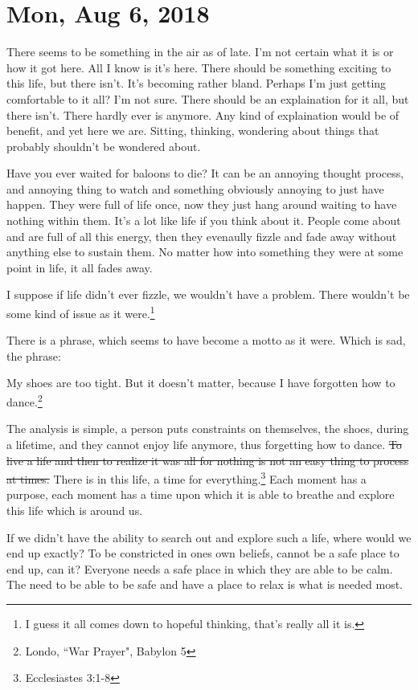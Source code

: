 \section{Mon, Aug 6, 2018}

There seems to be something in the air as of late. I'm not certain what it is or how
it got here. All I know is it's here. There should be something exciting to this
life, but there isn't. It's becoming rather bland. Perhaps I'm just getting
comfortable to it all? I'm not sure. There should be an explaination for it all, but
there isn't. There hardly ever is anymore. Any kind of explaination would be of
benefit, and yet here we are. Sitting, thinking, wondering about things that probably
shouldn't be wondered about.

Have you ever waited for baloons to die? It can be an annoying thought process, and
annoying thing to watch and something obviously annoying to just have happen. They
were full of life once, now they just hang around waiting to have nothing within
them. It's a lot like life if you think about it. People come about and are full of
all this energy, then they evenaully fizzle and fade away without anything else to
sustain them. No matter how into something they were at some point in life, it all
fades away.

I suppose if life didn't ever fizzle, we wouldn't have a problem. There wouldn't be
some kind of issue as it were.\footnote{I guess it all comes down to hopeful
thinking, that's really all it is.}

There is a phrase, which seems to have become a motto as it were. Which is sad, the
phrase:

\begin{displayquote}
My shoes are too tight. But it doesn't matter, because I have forgotten how to 
dance.\footnote{Londo, ``War Prayer", Babylon 5}
\end{displayquote}

The analysis is simple, a person puts constraints on themselves, the shoes, during a
lifetime, and they cannot enjoy life anymore, thus forgetting how to dance. \st{To 
live a life and then to realize it was all for nothing is not an easy thing to
process at times.} There is in this life, a time for everything.\footnote{
Ecclesiastes 3:1-8} Each moment has a purpose, each moment has a time upon which it 
is able to breathe and explore this life which is around us.

If we didn't have the ability to search out and explore such a life, where would we
end up exactly? To be constricted in ones own beliefs, cannot be a safe place to end
up, can it? Everyone needs a safe place in which they are able to be calm. The need
to be able to be safe and have a place to relax is what is needed most.

